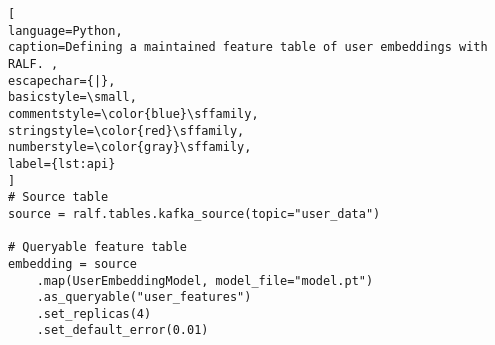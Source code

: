 \begin{lstlisting}[
language=Python, 
caption=Defining a maintained feature table of user embeddings with RALF. , 
escapechar={|},  
basicstyle=\small,
commentstyle=\color{blue}\sffamily,
stringstyle=\color{red}\sffamily,
numberstyle=\color{gray}\sffamily,
label={lst:api}
]
# Source table 
source = ralf.tables.kafka_source(topic="user_data")

# Queryable feature table 
embedding = source
    .map(UserEmbeddingModel, model_file="model.pt")
    .as_queryable("user_features")
    .set_replicas(4)
    .set_default_error(0.01)
\end{lstlisting}

